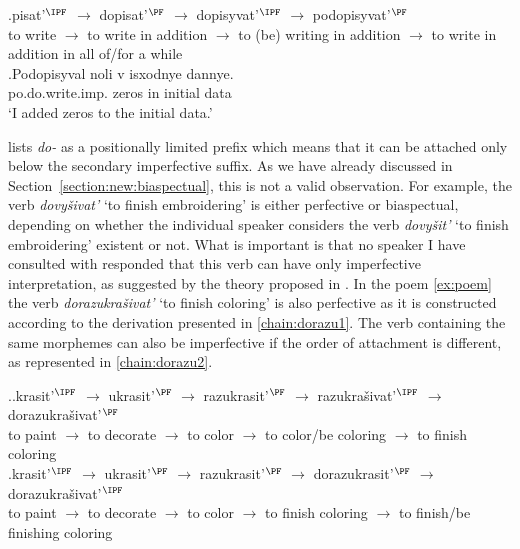 \exg.\label{chain:podo}pisat'$^{\IPF}$ $\rightarrow$ dopisat'$^{\PF}$ $\rightarrow$ dopisyvat'$^{\IPF}$ $\rightarrow$ podopisyvat'$^{\PF}$\\
{to write} $\rightarrow$ {to write in addition} $\rightarrow$ {to (be) writing in addition} $\rightarrow$ {to write in addition in all of/for a while}\\

\exg.\label{ex:podopisyval}Podopisyval noli v isxodnye dannye.\\
po.do.write.imp. zeros in initial data\\
\trans `I added zeros to the initial data.'

\citet{Tatevosov:09} lists \textit{do-} as a positionally limited prefix which means that it can be attached only below the secondary imperfective suffix. As we have already discussed in Section~\ref{section:new:biaspectual}, this is not a valid observation. For example, the verb \textit{dovy\v{s}ivat'} `to finish embroidering' is either perfective or biaspectual, depending on whether the individual speaker considers the verb \textit{dovy\v{s}it'} `to finish embroidering' existent or not. What is important is that no speaker I have consulted with responded that this verb can have only imperfective interpretation, as suggested by the theory proposed in \citealt{Tatevosov:09}. In the poem \ref{ex:poem} the verb \textit{dorazukra\v{s}ivat'} `to finish coloring' is also perfective as it is constructed according to the derivation presented in \ref{chain:dorazu1}. The verb containing the same morphemes can also be imperfective if the order of attachment is different, as represented in \ref{chain:dorazu2}.

\ex.\ag.\label{chain:dorazu1}krasit'$^{\IPF}$ $\rightarrow$ ukrasit'$^{\PF}$ $\rightarrow$ razukrasit'$^{\PF}$ $\rightarrow$ razukra\v{s}ivat'$^{\IPF}$ $\rightarrow$ dorazukra\v{s}ivat'$^{\PF}$\\
{to paint} $\rightarrow$ {to decorate} $\rightarrow$ {to color} $\rightarrow$ {to color/be coloring} $\rightarrow$ {to finish coloring}\\
\bg.\label{chain:dorazu2}krasit'$^{\IPF}$ $\rightarrow$ ukrasit'$^{\PF}$ $\rightarrow$ razukrasit'$^{\PF}$ $\rightarrow$ dorazukrasit'$^{\PF}$ $\rightarrow$ dorazukra\v{s}ivat'$^{\IPF}$\\
{to paint} $\rightarrow$ {to decorate} $\rightarrow$ {to color} $\rightarrow$ {to finish coloring} $\rightarrow$ {to finish/be finishing coloring}\\

